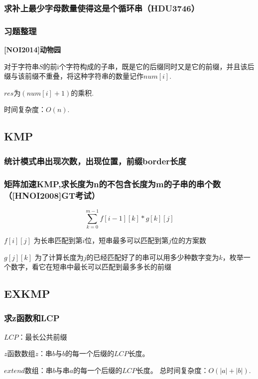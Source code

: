 \documentclass[landscape,twocolumn,twoside,a4paper]{article}
\begin{document}
\subsubsection{求补上最少字母数量使得这是个循环串（HDU3746）}


\subsubsection{习题整理}
\textbf{[NOI2014]动物园}\par
对于字符串$S$的前i个字符构成的子串，既是它的后缀同时又是它的前缀，并且该后缀与该前缀不重叠，将这种字符串的数量记作$num[i]$.\par
$res$为$(num[i]+1)$的乘积.\par
时间复杂度：$O(n).$


\subsection{KMP}

\subsubsection{统计模式串出现次数，出现位置，前缀border长度}


\subsubsection{矩阵加速KMP,求长度为n的不包含长度为m的子串的串个数（[HNOI2008]GT考试）}
$$\sum_{k=0}^{m-1}f[i-1][k]\ast g[k][j]$$\par
$f[i][j]$ 为长串匹配到第$i$位，短串最多可以匹配到第$j$位的方案数\par
$g[j][k]$ 为了计算长度为$j$的已经匹配好了的串可以用多少种数字变为$k$，枚举一个数字，看它在短串中最长可以匹配到最多多长的前缀\par


\subsection{EXKMP}

\subsubsection{求z函数和LCP}
$LCP$：最长公共前缀\par
$z$函数数组$z$：串$b$与$b$的每一个后缀的$LCP$长度。\par
$extend$数组：串$b$与串$a$的每一个后缀的$LCP$长度。
总时间复杂度：$O(|a|+|b|)$.

\end{document}
